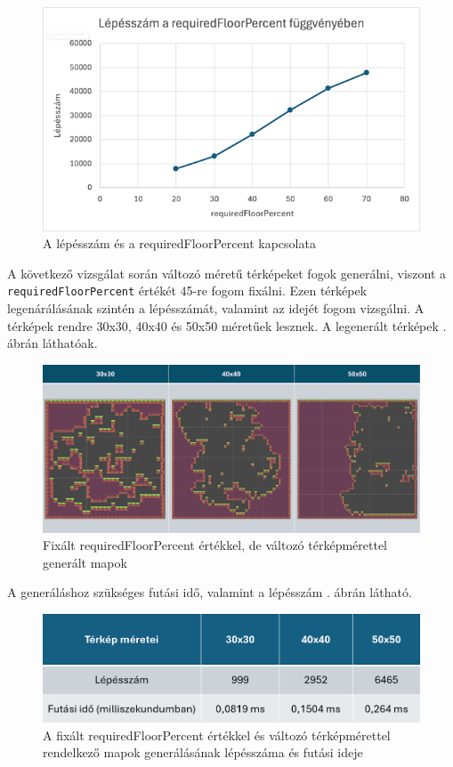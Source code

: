 \begin{figure}[ht]
\centering
\includegraphics[width = \textwidth]{images/grafikon.png}
\caption{A lépésszám és a requiredFloorPercent kapcsolata}
\label{fig:randomwalkgrafikon}
\end{figure}

\newpage
A következő vizsgálat során változó méretű térképeket fogok generálni, viszont a \texttt{requiredFloorPercent} értékét 45-re fogom fixálni. Ezen térképek legenárálásának szintén a lépésszámát, valamint az idejét fogom vizsgálni. A térképek rendre 30x30, 40x40 és 50x50 méretűek lesznek. A legenerált térképek . ábrán láthatóak.

\begin{figure}[ht]
\centering
\includegraphics[width = \textwidth]{images/changingmaprandomwalk.png}
\caption{Fixált requiredFloorPercent értékkel, de változó térképmérettel generált mapok}
\label{fig:changingmaprandomwalk}
\end{figure}

A generáláshoz szükséges futási idő, valamint a lépésszám . ábrán látható.

\begin{figure}[ht]
\centering
\includegraphics[width=\textwidth]{images/runtime4changinmapsizerandomwalk.png}
\caption{A fixált requiredFloorPercent értékkel és változó térképmérettel rendelkező mapok generálásának lépésszáma és futási ideje}
\label{fig:runtimestepcount1}
\end{figure}

